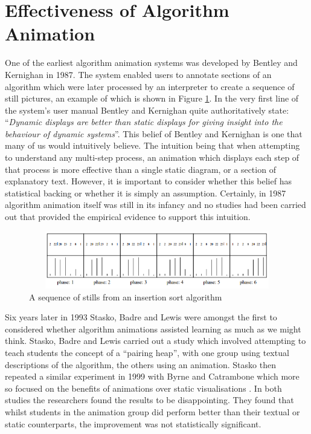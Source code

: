 \documentclass{l4proj}
\begin{document}
\section{Effectiveness of Algorithm Animation}
One of the earliest algorithm animation systems was developed by Bentley and Kernighan in 1987\cite{BentleyKernighan}. The system enabled users to annotate sections of an algorithm which were later processed by an interpreter to create a sequence of still pictures, an example of which is shown in Figure \ref{fig:bentley-kernighan}. In the very first line of the system's user manual Bentley and Kernighan quite authoritatively state: ``\textit{Dynamic displays are better than static displays for giving insight into the behaviour of dynamic systems}''. This belief of Bentley and Kernighan is one that many of us would intuitively believe. The intuition being that when attempting to understand any multi-step process, an animation which displays each step of that process is more effective than a single static diagram, or a section of explanatory text. However, it is important to consider whether this belief has statistical backing or whether it is simply an assumption. Certainly, in 1987 algorithm animation itself was still in its infancy and no studies had been carried out that provided the empirical evidence to support this intuition. 

\begin{figure}[h]
\centering
\includegraphics[height=2.5cm,width=13cm]{images/bentleykernighan.png}
\caption{A sequence of stills from an insertion sort algorithm}
\label{fig:bentley-kernighan}	
\end{figure}

Six years later in 1993 Stasko, Badre and Lewis were amongst the first to considered whether algorithm animations assisted learning as much as we might think\cite{StaskoBadreLewis}. Stasko, Badre and Lewis carried out a study which involved attempting to teach students the concept of a ``pairing heap'', with one group using textual descriptions of the algorithm, the others using an animation. Stasko then repeated a similar experiment in 1999 with Byrne and Catrambone which more so focused on the benefits of animations over static visualisations \cite{StaskoByrneCatrambone}. In both studies the researchers found the results to be disappointing. They found that whilst students in the animation group did perform better than their textual or static counterparts, the improvement was not statistically significant.
\end{document}
